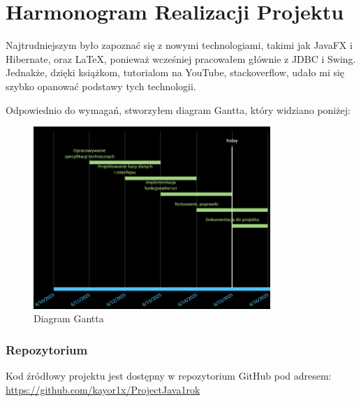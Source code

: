\chapter{Harmonogram Realizacji Projektu}
\label{cha:harmonogramRealizacjiProjektu}

Najtrudniejszym było zapoznać się z nowymi technologiami, takimi jak JavaFX i Hibernate, oraz LaTeX, ponieważ wcześniej pracowałem głównie z JDBC i Swing. Jednakże, dzięki książkom, tutorialom na YouTube, stackoverflow, udało mi się szybko opanować podstawy tych technologii.

Odpowiednio do wymagań, stworzyłem diagram Gantta, który widziano poniżej:

\begin{figure}[h!]
    \centering
    \includegraphics[width=0.8\textwidth]{figures/Gantt.png}
    \caption{Diagram Gantta \label{fig2}}
\end{figure}

\subsection{Repozytorium}

Kod źródłowy projektu jest dostępny w repozytorium GitHub pod adresem: \url{https://github.com/kayor1x/ProjectJava1rok}

